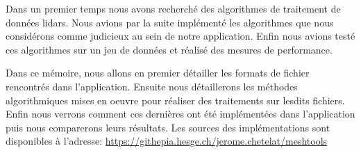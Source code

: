 Dans un premier temps nous avons recherché des algorithmes de
traitement de données lidars.
Nous avions par la suite implémenté les algorithmes que nous considérons comme judicieux au sein de notre application.
Enfin nous avions testé ces algorithmes sur un jeu de données et réalisé des mesures
de performance.

Dans ce mémoire, nous allons en premier détailler les formats de fichier 
rencontrés dans l'application.
Ensuite nous détaillerons les méthodes algorithmiques mises en oeuvre pour
réaliser des traitements sur lesdits fichiers.
Enfin nous verrons comment ces dernières ont été implémentées dans
l'application puis nous comparerons leurs résultats.
Les sources des implémentations sont disponibles à l'adresse: \href{https://githepia.esge.ch/jerome.chetelat/meshtools}{https://githepia.hesge.ch/jerome.chetelat/meshtools}
